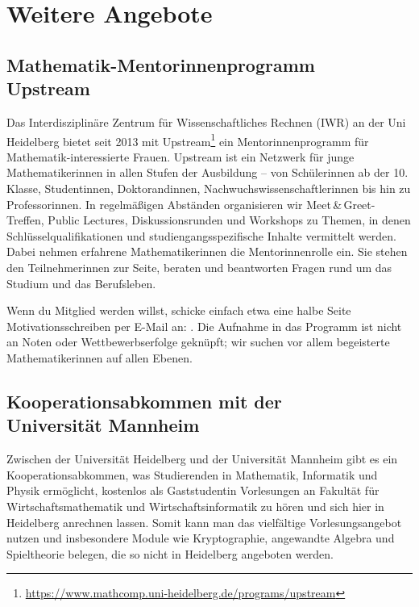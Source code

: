 \section{Weitere Angebote}

\subsection{Mathematik-Mentorinnenprogramm \\Upstream}
Das Interdisziplinäre Zentrum für Wissenschaftliches Rechnen (IWR) an der Uni Heidelberg bietet seit 2013 mit Upstream\footnote{\url{https://www.mathcomp.uni-heidelberg.de/programs/upstream}} ein Mentorinnenprogramm für Mathematik-interessierte Frauen. Upstream ist ein Netzwerk für junge Mathematikerinnen in allen Stufen der Ausbildung -- von Schülerinnen ab der 10. Klasse, Studentinnen, Doktorandinnen, Nachwuchswissenschaftlerinnen bis hin zu Professorinnen. In regelmäßigen Abständen organisieren wir Meet\,\&\,Greet-Treffen, Public Lectures, Diskussionsrunden und Workshops zu Themen, in denen Schlüsselqualifikationen und studiengangsspezifische Inhalte vermittelt werden. Dabei nehmen erfahrene Mathematikerinnen die Mentorinnenrolle ein. Sie stehen den Teilnehmerinnen zur Seite, beraten und beantworten Fragen rund um das Studium und das Berufsleben.

Wenn du Mitglied werden willst, schicke einfach etwa eine halbe Seite Motivationsschreiben per E-Mail an: . Die Aufnahme in das Programm ist nicht an Noten oder Wettbewerbserfolge geknüpft; wir suchen vor allem begeisterte Mathematikerinnen auf allen Ebenen.

\subsection{Kooperationsabkommen mit der \\Universität Mannheim}
Zwischen der Universität Heidelberg und der Universität Mannheim gibt es ein Kooperationsabkommen, was Studierenden in Mathematik, Informatik und Physik ermöglicht, kostenlos als Gaststudentin Vorlesungen an Fakultät für Wirtschaftsmathematik und Wirtschaftsinformatik zu hören und sich hier in Heidelberg anrechnen lassen.
Somit kann man das vielfältige Vorlesungsangebot nutzen und insbesondere Module wie Kryptographie, angewandte Algebra und Spieltheorie belegen, die so nicht in Heidelberg angeboten werden.